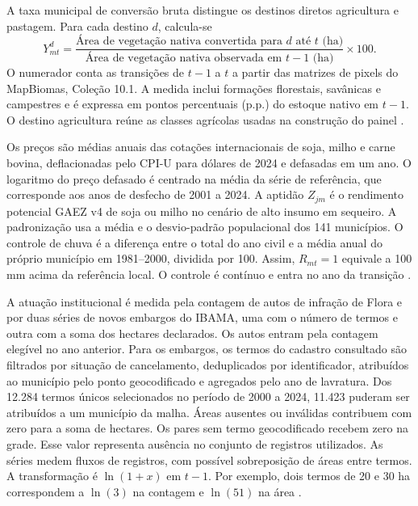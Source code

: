A taxa municipal de conversão bruta distingue os destinos diretos agricultura e pastagem. Para cada destino $d$, calcula-se
\begin{equation}
    Y_{mt}^d = \frac{\text{Área de vegetação nativa convertida para } d \text{ até } t \text{ (ha)}}{\text{Área de vegetação nativa observada em } t-1 \text{ (ha)}} \times 100 .
    \label{eq:taxa-conversao}
\end{equation}
O numerador conta as transições de $t-1$ a $t$ a partir das matrizes de pixels do MapBiomas, Coleção 10.1. A medida inclui formações florestais, savânicas e campestres e é expressa em pontos percentuais (p.p.) do estoque nativo em $t-1$. O destino agricultura reúne as classes agrícolas usadas na construção do painel \cite{MapBiomas2026}.

Os preços são médias anuais das cotações internacionais de soja, milho e carne bovina, deflacionadas pelo CPI-U para dólares de 2024 e defasadas em um ano. O logaritmo do preço defasado é centrado na média da série de referência, que corresponde aos anos de desfecho de 2001 a 2024. A aptidão $Z_{jm}$ é o rendimento potencial GAEZ v4 de soja ou milho no cenário de alto insumo em sequeiro. A padronização usa a média e o desvio-padrão populacional dos 141 municípios. O controle de chuva é a diferença entre o total do ano civil e a média anual do próprio município em 1981--2000, dividida por 100. Assim, $R_{mt}=1$ equivale a 100 mm acima da referência local. O controle é contínuo e entra no ano da transição \cite{WorldBank2026, BLSCPI2026, FAOGAEZ2021, FunkEtAl2015}.

A atuação institucional é medida pela contagem de autos de infração de Flora e por duas séries de novos embargos do IBAMA, uma com o número de termos e outra com a soma dos hectares declarados. Os autos entram pela contagem elegível no ano anterior. Para os embargos, os termos do cadastro consultado são filtrados por situação de cancelamento, deduplicados por identificador, atribuídos ao município pelo ponto geocodificado e agregados pelo ano de lavratura. Dos 12.284 termos únicos selecionados no período de 2000 a 2024, 11.423 puderam ser atribuídos a um município da malha. Áreas ausentes ou inválidas contribuem com zero para a soma de hectares. Os pares sem termo geocodificado recebem zero na grade. Esse valor representa ausência no conjunto de registros utilizados. As séries medem fluxos de registros, com possível sobreposição de áreas entre termos. A transformação é $\ln(1+x)$ em $t-1$. Por exemplo, dois termos de 20 e 30 ha correspondem a $\ln(3)$ na contagem e $\ln(51)$ na área \cite{IBAMA2026, IBAMAEmbargos2026}.

